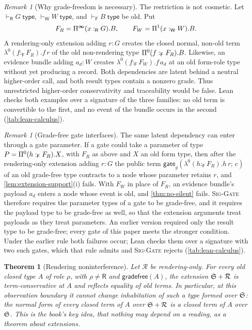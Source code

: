 \documentclass[11pt]{article}
\numberwithin{equation}{section}
\theoremstyle{definition}
\theoremstyle{plain}
\newtheorem{theorem}[definition]{Theorem}
\theoremstyle{remark}
\newtheorem{remark}[definition]{Remark}
\newcommand{\Frm}{\mathsf F}
\newcommand{\Wit}{\mathsf W}
\newcommand{\Ren}{\mathsf R}
\newcommand{\absent}{\boldsymbol\infty}
\newcommand{\jtype}{\mathrel{\mathsf{type}}}
\begin{document}
\begin{remark}[Why grade-freedom is necessary]\label{rem:gradefree-boundary}
The restriction is not cosmetic.  Let \(\vdash_{\Ren}G\;\jtype\),
\(\vdash_{\Wit}W\;\jtype\), and \(\vdash_{\Frm}B\;\jtype\) be old.  Put
\[
 F_R=\AFDepFun^{\absent}(x:_{\Ren}G).B,
 \qquad F_W=\AFDepFun^1(x:_{\Wit}W).B.
\]
A rendering-only extension adding \(r:G\) creates the closed normal, non-old
term
\(
 \lambda^0(f:_{\Frm}F_R).f\,r
\)
of the old non-rendering type \(\AFDepFun^0(f:_{\Frm}F_R).B\).  Likewise, an evidence
bundle adding \(a_d:W\) creates
\(
 \lambda^0(f:_{\Frm}F_W).f\,a_d
\)
at an old form-role type without yet producing a record.  Both dependencies
are latent behind a neutral higher-order call, and both result types contain a
nonzero grade.  Thus unrestricted higher-order conservativity and traceability
would be false.  Lean checks both examples over a signature of the three
families: no old term is convertible to the first, and no event of the bundle
occurs in the second (\cref{tab:lean-calculus}).
\end{remark}

\begin{remark}[Grade-free gate interfaces]\label{rem:gate-interface}
The same latent dependency can enter through a gate parameter.  If a gate
could take a parameter of type
\(P=\AFDepFun^0(h:_{\Frm}F_R).X\), with \(F_R\) as above and \(X\) an old form
type, then after the rendering-only extension adding \(r:G\) the public term
\(\mathsf{gate}_g(\lambda^0(h:_{\Frm}F_R).h\,r;\,c)\) of an old grade-free
type contracts to a node whose parameter retains \(r\), and
\cref{lem:extension-support}(i) fails.  With \(F_W\) in place of \(F_R\), an
evidence bundle's payload \(a_d\) enters a node whose event is old, and
\cref{thm:no-silent} fails.  \textsc{Sig-Gate} therefore requires the
parameter types of a gate to be grade-free, and it requires the payload type
to be grade-free as well, so that the extension arguments treat payloads as
they treat parameters.  An earlier version required only the result type to
be grade-free; every gate of this paper meets the stronger condition.  Under
the earlier rule both failures occur; Lean checks them over a signature with
two such gates, which that rule admits and \textsc{Sig-Gate} rejects
(\cref{tab:lean-calculus}).
\end{remark}

\begin{theorem}[Rendering noninterference]\label{thm:rendering}
Let \(\mathcal R\) be rendering-only.  For every old closed type
\(A\) of role \(\rho\), with \(\rho\ne\Ren\) and \(\mathsf{gradefree}(A)\), the extension
\({\mathfrak S}+\mathcal R\) is term-conservative at \(A\) and reflects equality of
old terms.  In particular, at this observation boundary it cannot change
inhabitation of such a type formed over \({\mathfrak S}\): the normal form of
every closed term of \(A\) over \({\mathfrak S}+\mathcal R\) is a closed
term of \(A\) over \({\mathfrak S}\).  This is the book's key idea, that
nothing may depend on a reading, as a theorem about extensions.
\end{theorem}
\end{document}
